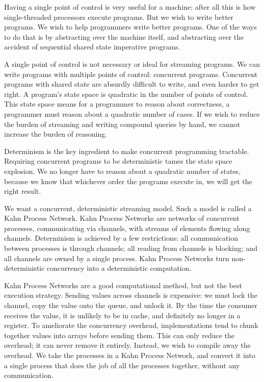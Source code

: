Having a single point of control is very useful for a machine; after all this is how single-threaded processors execute programs.
But we wish to write better programs.
We wish to help programmers write better programs.
One of the ways to do that is by abstracting over the machine itself, and abstracting over the accident of sequential shared state imperative programs.

A single point of control is not necessary or ideal for streaming programs.
We can write programs with multiple points of control: concurrent programs.
Concurrent programs with shared state are absurdly difficult to write, and even harder to get right.
A program's state space is quadratic in the number of points of control.
This state space means for a programmer to reason about correctness, a programmer must reason about a quadratic number of cases.
If we wish to reduce the burden of streaming and writing compound queries by hand, we cannot increase the burden of reasoning.

Determinism is the key ingredient to make concurrent programming tractable.
Requiring concurrent programs to be deterministic tames the state space explosion.
We no longer have to reason about a quadratic number of states, because we know that whichever order the programs execute in, we will get the right result.

We want a concurrent, deterministic streaming model.
Such a model is called a Kahn Process Network.
Kahn Process Networks are networks of concurrent processes, communicating via channels, with streams of elements flowing along channels.
Determinism is achieved by a few restrictions: all communication between processes is through channels; all reading from channels is blocking; and all channels are owned by a single process.
Kahn Process Networks turn non-deterministic concurrency into a deterministic computation.

% 
% 

Kahn Process Networks are a good computational method, but not the best execution strategy.
Sending values across channels is expensive: we must lock the channel, copy the value onto the queue, and unlock it.
By the time the consumer receives the value, it is unlikely to be in cache, and definitely no longer in a register.
To ameliorate the concurrency overhead, implementations tend to chunk together values into arrays before sending them.
This can only reduce the overhead; it can never remove it entirely.
Instead, we wish to compile away the overhead.
We take the processes in a Kahn Process Network, and convert it into a single process that does the job of all the processes together, without any communication.

